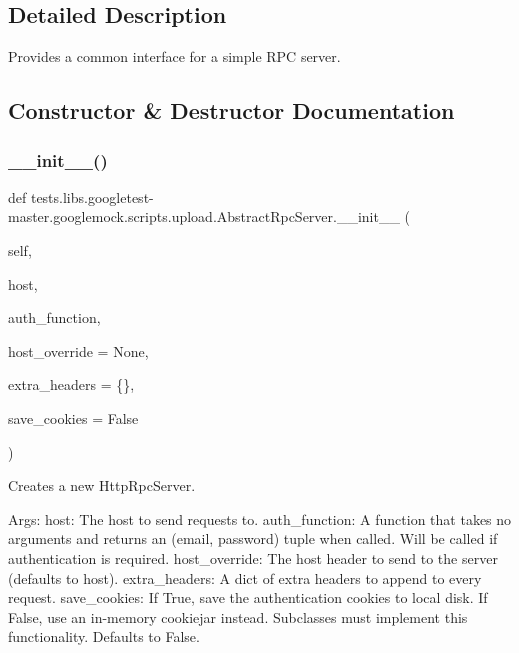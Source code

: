 \subsection{Detailed Description}
\begin{DoxyVerb}Provides a common interface for a simple RPC server.\end{DoxyVerb}
 

\subsection{Constructor \& Destructor Documentation}
\mbox{\label{classtests_1_1libs_1_1googletest-master_1_1googlemock_1_1scripts_1_1upload_1_1AbstractRpcServer_adf0b0dfc72921835be390bcccab3f73b}} 
\subsubsection{\texorpdfstring{\+\_\+\+\_\+init\+\_\+\+\_\+()}{\_\_init\_\_()}}
{\footnotesize\ttfamily def tests.\+libs.\+googletest-\/master.\+googlemock.\+scripts.\+upload.\+Abstract\+Rpc\+Server.\+\_\+\+\_\+init\+\_\+\+\_\+ (\begin{DoxyParamCaption}\item[{}]{self,  }\item[{}]{host,  }\item[{}]{auth\+\_\+function,  }\item[{}]{host\+\_\+override = {\ttfamily None},  }\item[{}]{extra\+\_\+headers = {\ttfamily \{\}},  }\item[{}]{save\+\_\+cookies = {\ttfamily False} }\end{DoxyParamCaption})}

\begin{DoxyVerb}Creates a new HttpRpcServer.

Args:
  host: The host to send requests to.
  auth_function: A function that takes no arguments and returns an
(email, password) tuple when called. Will be called if authentication
is required.
  host_override: The host header to send to the server (defaults to host).
  extra_headers: A dict of extra headers to append to every request.
  save_cookies: If True, save the authentication cookies to local disk.
If False, use an in-memory cookiejar instead.  Subclasses must
implement this functionality.  Defaults to False.
\end{DoxyVerb}
 


